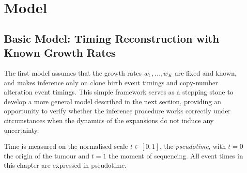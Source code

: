 \chapter{Model}


\section{Basic Model: Timing Reconstruction with Known Growth Rates}
The first model assumes that the growth rates $w_1, \ldots, w_K$ are fixed and 
known, and makes inference only on clone birth event timings and copy-number 
alteration event timings. This simple framework serves as a stepping stone to 
develop a more general model described in the next section, providing an 
opportunity to verify whether the inference procedure works correctly under
circumstances when the dynamics of the expansions do not induce any uncertainty.

\begin{definition}[Pseudotime]
\label{def:pseudotime}
Time is measured on the normalised scale $t\in[0,1]$, the \emph{pseudotime}, with
$t=0$ the origin of the tumour and $t=1$ the moment of sequencing. All event times
in this chapter are expressed in pseudotime.
\end{definition}

